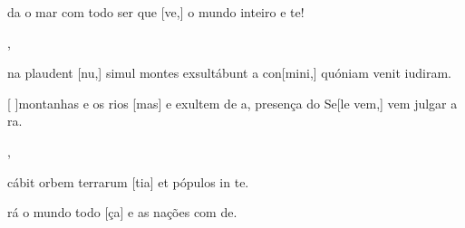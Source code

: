 {    {\item {}da o mar com todo ser que [ve,] o mundo inteiro e te!},
  {\item {}na plaudent [nu,] simul montes exsultábunt a con[mini,] quóniam venit iudiram.}%
    {\item {}[ ]{mon}tanhas e os rios [mas] e exultem de a,  presença do Se[le vem,] vem julgar a ra.},
  {\item {}cábit orbem terrarum [tia] et pópulos in \-te.}%
    {\item {}rá o mundo todo [ça] e as nações com de.}
}